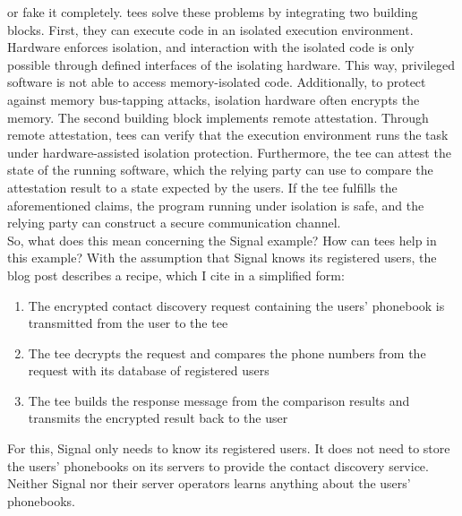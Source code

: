 or fake it completely. \glspl{tee} solve these problems by
integrating two building blocks. First, they can execute code in an isolated
execution environment. Hardware enforces isolation, and interaction with the
isolated code is only possible through defined interfaces of the isolating
hardware. This way, privileged software is not able to access memory-isolated
code. Additionally, to protect against memory bus-tapping attacks, isolation
hardware often encrypts the memory. The second building block implements remote
attestation. Through remote attestation, \glspl{tee} can verify that the
execution environment runs the task under hardware-assisted isolation
protection. Furthermore, the \gls{tee} can attest the state of the running
software, which the relying party can use to compare the attestation result to a
state expected by the users. If the \gls{tee} fulfills the aforementioned
claims, the program running under isolation is safe, and the relying party can
construct a secure communication channel.\\

So, what does this mean concerning the Signal example? How can \glspl{tee} help
in this example? With the assumption that Signal knows its registered users, the
blog post describes a recipe, which I cite in a simplified form:
\begin{enumerate}
  \item The encrypted contact discovery request containing the users' phonebook
    is transmitted from the user to the \gls{tee}
  \item The \gls{tee} decrypts the request and compares the phone numbers from
    the request with its database of registered users
  \item The \gls{tee} builds the response message from the comparison results
    and transmits the encrypted result back to the user
\end{enumerate}
For this, Signal only needs to know its registered users. It does not need to
store the users' phonebooks on its servers to provide the contact discovery
service. Neither Signal nor their server operators learns anything about the
users' phonebooks.

